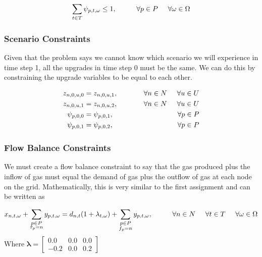 \documentclass{article}
\begin{document}
\[\sum_{t \in T} \psi_{p,t,\omega} \leq 1, \hspace{1cm} \forall p \in P \hspace{0.5cm} \forall \omega \in \Omega\]


\newpage
\noindent
\subsubsection{Scenario Constraints}
Given that the problem says we cannot know which scenario we will experience in time step 1, all the upgrades in time step 0 must be the same. We can do this by constraining the upgrade variables to be equal to each other.

\begin{align}
    z_{n,0,u,0} &= z_{n,0,u,1}, & \hspace{1cm} \forall n \in N \hspace{0.5cm} \forall u \in U \\
    z_{n,0,u,1} &= z_{n,0,u,2}, & \hspace{1cm} \forall n \in N \hspace{0.5cm} \forall u \in U \\
    \psi_{p,0,0} &= \psi_{p,0,1}, & \hspace{1cm} \forall p \in P \\
    \psi_{p,0,1} &= \psi_{p,0,2}, & \hspace{1cm} \forall p \in P
\end{align}

\bigskip
\noindent
\subsubsection{Flow Balance Constraints}
We must create a flow balance constraint to say that the gas produced plus the inflow of gas must equal the demand of gas plus the outflow of gas at each node on the grid. Mathematically, this is very similar to the first assignment and can be written as

\[x_{n,t,\omega}+\sum_{\substack{p\in P \\ \tau_p = n}}y_{p,t,\omega} = d_{n,t} (1 + \lambda_{t,\omega}) + \sum_{\substack{p\in P \\ f_p = n}}y_{p,t,\omega}, \hspace{1cm} \forall n \in N \hspace{0.5cm} \forall t \in T \hspace{0.5cm} \forall \omega \in \Omega\]
\smallskip\noindent
Where
\(\boldsymbol{\lambda} = 
    \begin{bmatrix}
    0.0 & 0.0 & 0.0 \\
    -0.2 & 0.0 & 0.2
    \end{bmatrix}\)
\end{document}
